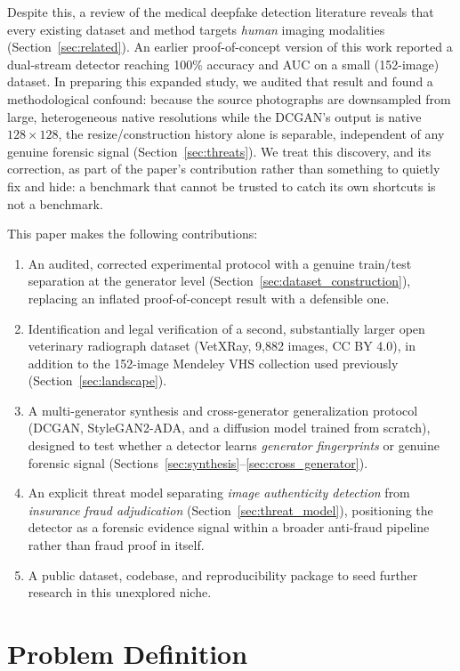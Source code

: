 \documentclass[journal]{IEEEtran}
\begin{document}
Despite this, a review of the medical deepfake detection literature reveals that every existing dataset and method targets \emph{human} imaging modalities (Section~\ref{sec:related}). An earlier proof-of-concept version of this work reported a dual-stream detector reaching 100\% accuracy and AUC on a small (152-image) dataset. In preparing this expanded study, we audited that result and found a methodological confound: because the source photographs are downsampled from large, heterogeneous native resolutions while the DCGAN's output is native $128\times128$, the resize/construction history alone is separable, independent of any genuine forensic signal (Section~\ref{sec:threats}). We treat this discovery, and its correction, as part of the paper's contribution rather than something to quietly fix and hide: a benchmark that cannot be trusted to catch its own shortcuts is not a benchmark.

This paper makes the following contributions:
\begin{enumerate}
  \item An audited, corrected experimental protocol with a genuine train/test separation at the generator level (Section~\ref{sec:dataset_construction}), replacing an inflated proof-of-concept result with a defensible one.
  \item Identification and legal verification of a second, substantially larger open veterinary radiograph dataset (VetXRay, 9{,}882 images, CC BY 4.0), in addition to the 152-image Mendeley VHS collection used previously (Section~\ref{sec:landscape}).
  \item A multi-generator synthesis and cross-generator generalization protocol (DCGAN, StyleGAN2-ADA, and a diffusion model trained from scratch), designed to test whether a detector learns \emph{generator fingerprints} or genuine forensic signal (Sections~\ref{sec:synthesis}--\ref{sec:cross_generator}).
  \item An explicit threat model separating \emph{image authenticity detection} from \emph{insurance fraud adjudication} (Section~\ref{sec:threat_model}), positioning the detector as a forensic evidence signal within a broader anti-fraud pipeline rather than fraud proof in itself.
  \item A public dataset, codebase, and reproducibility package to seed further research in this unexplored niche.
\end{enumerate}

\section{Problem Definition}
\label{sec:problem}
\end{document}

